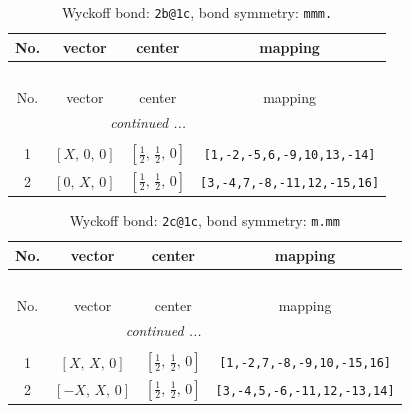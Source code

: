 \documentclass[fleqn,8pt]{jsarticle}
\begin{document}
\renewcommand{\arraystretch}{1.2}
\begin{longtable}{cccc}
\caption{Wyckoff bond: {\tt 2b@1c}, bond symmetry: {\tt mmm.}}
 \\
 \hline \hline
No. & vector & center & mapping \\ \hline \endfirsthead

\multicolumn{3}{l}{\tablename\ \thetable{}} \\
 \hline \hline
No. & vector & center & mapping \\ \hline \endhead

 \hline \hline
\multicolumn{3}{r}{\footnotesize\it continued ...} \\ \endfoot

 \hline \hline
\multicolumn{3}{r}{} \\ \endlastfoot

1 & $\left[ X,\, 0,\, 0 \right]$ & $\left[ \frac{1}{2},\, \frac{1}{2},\, 0 \right]$ & {\tt [1,-2,-5,6,-9,10,13,-14]} \\ \hline
2 & $\left[ 0,\, X,\, 0 \right]$ & $\left[ \frac{1}{2},\, \frac{1}{2},\, 0 \right]$ & {\tt [3,-4,7,-8,-11,12,-15,16]} \\
\end{longtable}
\renewcommand{\arraystretch}{1.2}
\begin{longtable}{cccc}
\caption{Wyckoff bond: {\tt 2c@1c}, bond symmetry: {\tt m.mm}}
 \\
 \hline \hline
No. & vector & center & mapping \\ \hline \endfirsthead

\multicolumn{3}{l}{\tablename\ \thetable{}} \\
 \hline \hline
No. & vector & center & mapping \\ \hline \endhead

 \hline \hline
\multicolumn{3}{r}{\footnotesize\it continued ...} \\ \endfoot

 \hline \hline
\multicolumn{3}{r}{} \\ \endlastfoot

1 & $\left[ X,\, X,\, 0 \right]$ & $\left[ \frac{1}{2},\, \frac{1}{2},\, 0 \right]$ & {\tt [1,-2,7,-8,-9,10,-15,16]} \\ \hline
2 & $\left[ - X,\, X,\, 0 \right]$ & $\left[ \frac{1}{2},\, \frac{1}{2},\, 0 \right]$ & {\tt [3,-4,5,-6,-11,12,-13,14]} \\
\end{longtable}
\renewcommand{\arraystretch}{1.2}
\end{document}
